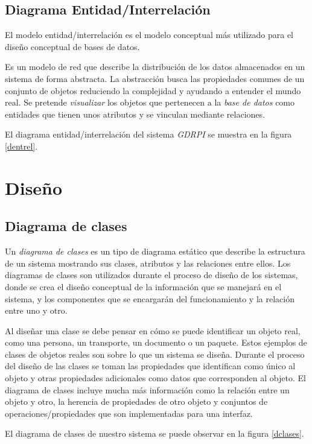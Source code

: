 \documentclass[11pt,a4paper,spanish,twoside]{book}
\begin{document}
\section{Diagrama Entidad/Interrelación}
El modelo entidad/interrelación es el modelo conceptual más utilizado para el 
diseño conceptual de bases de datos.

Es un modelo de red que describe la distribución de los datos almacenados en un 
sistema de forma abstracta. La abstracción busca las propiedades comunes de un 
conjunto de objetos reduciendo la complejidad y ayudando a entender el mundo 
real. Se pretende \emph{visualizar} los objetos que pertenecen a la
\emph{base de datos} como entidades que tienen unos atributos y se vinculan
mediante relaciones.

El diagrama entidad/interrelación del sistema \emph{GDRPI} se muestra en la
figura \ref{dentrel}.


\chapter{Diseño}
\section{Diagrama de clases}
Un \emph{diagrama de clases} es un tipo de diagrama estático que describe la
estructura de un sistema mostrando sus clases, atributos y las relaciones
entre ellos. Los diagramas de clases son utilizados durante el proceso de
diseño de los sistemas, donde se crea el diseño conceptual de la
información que se manejará en el sistema, y los componentes que se
encargarán del funcionamiento y la relación entre uno y otro.

Al diseñar una clase se debe pensar en cómo se puede identificar un objeto
real, como una persona, un transporte, un documento o un paquete. Estos
ejemplos de clases de objetos reales son sobre lo que un sistema se
diseña. Durante el proceso del diseño de las clases se toman las propiedades
que identifican como único al objeto y otras propiedades adicionales como
datos que corresponden al objeto. El diagrama de clases incluye mucha más
información como la relación entre un objeto y otro, la herencia de
propiedades de otro objeto y conjuntos de operaciones/propiedades que son
implementadas para una interfaz.

El diagrama de clases de nuestro sistema se puede observar en la figura
\ref{dclases}.
\end{document}
